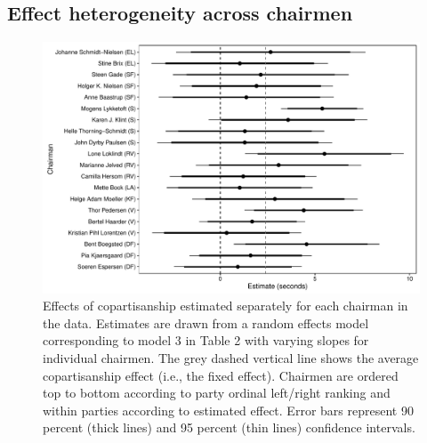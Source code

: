 \documentclass[12pt,a4paper]{article}
\begin{document}
\clearpage
\subsection{Effect heterogeneity across chairmen}\label{appchairranef}

\begin{figure}[!htbp]
\centering
\includegraphics[scale=.55]{../figures/parlbias_chairranefs}
  \caption{Effects of copartisanship estimated separately for each chairman in the data. Estimates are drawn from a random effects model corresponding to model 3 in Table 2 with varying slopes for individual chairmen. The grey dashed vertical line shows the average copartisanship effect (i.e., the fixed effect). Chairmen are ordered top to bottom according to party ordinal left/right ranking and within parties according to estimated effect. Error bars represent 90 percent (thick lines) and 95 percent (thin lines) confidence intervals.}\label{parlbias_chairranfefs}
\end{figure}
\end{document}
